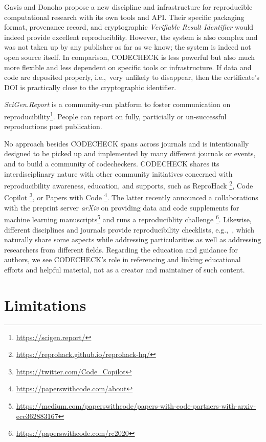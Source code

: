 \documentclass[12pt]{article}
\begin{document}
Gavis and Donoho \cite{gavish_universal_2011} propose a new discipline and 
infrastructure for reproducible computational research with its own tools and
API. Their specific packaging format, provenance record, and cryptographic
\emph{Verifiable Result Identifier} would indeed provide excellent
reproduciblity. However, the system is also complex and was not taken up by
any publisher as far as we know; the system is indeed not open source itself.
In comparison, CODECHECK is less powerful but also much more flexible and
less dependent on specific tools or infrastructure. If data and code are 
deposited properly, i.e.,~very unlikely to disappear, then the certificate's 
DOI is practically close to the cryptographic identifier.

\emph{SciGen.Report} is a community-run platform to foster communication on
reproducibility\footnote{\url{https://scigen.report/}}. People can report on
fully, particially or un-successful reproductions post publication.

No approach besides CODECHECK spans across journals and is
intentionally designed to be picked up and implemented by many different 
journals or events, and to build a community of codecheckers. CODECHECK shares
its interdisciplinary nature with other community initiatives concerned with 
reproducibility awareness, education, and supports, such as ReproHack
\footnote{\url{https://reprohack.github.io/reprohack-hq/}}, Code Copilot
\footnote{\url{https://twitter.com/Code_Copilot}}, or Papers with Code
\footnote{\url{https://paperswithcode.com/about}}.
The latter recently announced a collaborations with the preprint server
\emph{arXiv} on providing data and code supplements for machine learning
manuscripts\footnote{\url{https://medium.com/paperswithcode/papers-with-code-partners-with-arxiv-ecc362883167}} and runs a reproduciblity challenge
\footnote{\url{https://paperswithcode.com/rc2020}}.
Likewise, different disciplines and journals provide reproducibility
checklists, e.g.,~\cite{rosenberg_next_2020}, which naturally share some
aspects while addressing particularities as well as addressing researchers
from different fields. Regarding the education and guidance for authors, 
we see CODECHECK's role in referencing and linking educational efforts
and helpful material, not as a creator and maintainer of such content.

\section*{Limitations}\label{limitations}
\end{document}
